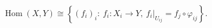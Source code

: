 \[\operatorname{Hom}(X,Y)\cong\left\{(f_i)_i:\ f_i:X_i\to Y,\ f_i|_{U_{ij}}=f_j\circ\varphi_{ij}\right\}.\]
